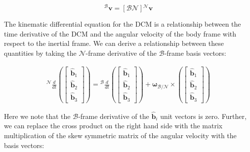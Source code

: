 \documentclass[
]{article}
\begin{document}
\[{}^\mathcal{B}\boldsymbol{v} = \left[\mathcal{BN}\right] {}^\mathcal{N}\boldsymbol{v}\]

The kinematic differential equation for the DCM is a relationship
between the time derivative of the DCM and the angular velocity of the
body frame with respect to the inertial frame. We can derive a
relationship between these quantities by taking the
\(\mathcal{N}\)-frame derivative of the \(\mathcal{B}\)-frame basis
vectors:

\[\begin{aligned}
{}^\mathcal{N}\frac{d}{dt}\left(
        \begin{bmatrix}
            \hat{\boldsymbol{b}}_1 \\ \hat{\boldsymbol{b}}_2 \\ \hat{\boldsymbol{b}}_3
        \end{bmatrix}
    \right) = {}^\mathcal{B}\frac{d}{dt}\left(
        \begin{bmatrix}
            \hat{\boldsymbol{b}}_1 \\ \hat{\boldsymbol{b}}_2 \\ \hat{\boldsymbol{b}}_3
        \end{bmatrix}
    \right) + \boldsymbol{\omega}_\mathcal{B/N} \times \left(
        \begin{bmatrix}
            \hat{\boldsymbol{b}}_1 \\ \hat{\boldsymbol{b}}_2 \\ \hat{\boldsymbol{b}}_3
        \end{bmatrix}
    \right)
\end{aligned}\]

Here we note that the \(\mathcal{B}\)-frame derivative of the
\(\hat{\boldsymbol{b}}_i\) unit vectors is zero. Further, we can replace
the cross product on the right hand side with the matrix multiplication
of the skew symmetric matrix of the angular velocity with the basis
vectors:
\end{document}
